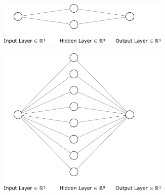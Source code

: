 \begin{figure}[htbp]
	\centering
	\begin{subfigure}{0.47\textwidth}
		\centering
		\includegraphics[width=0.9\textwidth]{../Problem 4/nn_1_2_1.pdf}
		\caption{}
	\end{subfigure}
	\begin{subfigure}{0.47\textwidth}
		\centering
		\includegraphics[width=0.9\textwidth]{../Problem 4/nn_1_8_1.pdf}
		\caption{}
	\end{subfigure}
	\begin{subfigure}{0.47\textwidth}
		\centering

\end{subfigure}
\end{figure}
